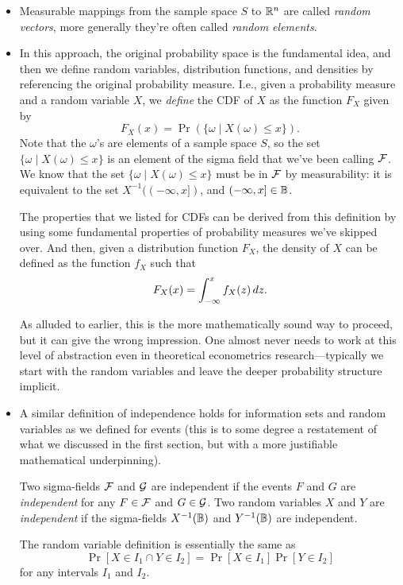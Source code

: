 \begin{itemize}[leftmargin=0pt]
\item Measurable mappings from the sample space $S$ to $\mathbb{R}^n$ are
  called \emph{random vectors}, more generally they're often called
  \emph{random elements}.

\item In this approach, the original probability space is the
  fundamental idea, and then we define random variables, distribution
  functions, and densities by referencing the original probability
  measure.  I.e., given a probability measure and a random variable
  $X$, we \emph{define} the CDF of $X$ as the function $F_X$ given by
  \begin{equation*}
    F_X(x) = \Pr(\{\omega \mid X(\omega) \leq x\}).
  \end{equation*}
  Note that the $\omega$'s are elements of a sample space $S$, so the
  set $\{\omega \mid X(\omega) \leq x\}$ is an element of the sigma
  field that we've been calling $\mathcal{F}$.  We know that the set $\{\omega
  \mid X(\omega) \leq x\}$ must be in $\mathcal{F}$ by measurability: it is
  equivalent to the set $X^{-1}((-\infty,x])$, and $(-\infty,x] \in
  \mathbb{B}$.

  The properties that we listed for CDFs can be derived from this
  definition by using some fundamental properties of probability
  measures we've skipped over.  And then, given a distribution
  function $F_X$, the density of $X$ can be defined as the function
  $f_X$ such that
  \begin{equation*}
    F_X(x) = \int_{-\infty}^{x} f_X(z) \,dz.
  \end{equation*}

  As alluded to earlier, this is the more mathematically sound way to
  proceed, but it can give the wrong impression.  One almost never
  needs to work at this level of abstraction even in theoretical
  econometrics research---typically we start with the random variables
  and leave the deeper probability structure implicit.

\item A similar definition of independence holds for information sets
  and random variables as we defined for events (this is to some
  degree a restatement of what we discussed in the first section, but
  with a more justifiable mathematical underpinning).
  \begin{defn}
    Two sigma-fields $\mathcal{F}$ and $\mathcal{G}$ are independent if the events $F$
    and $G$ are \emph{independent} for any $F \in \mathcal{F}$ and $G \in \mathcal{G}$.
    Two random variables $X$ and $Y$ are \emph{independent} if the
    sigma-fields $X^{-1}(\mathbb{B})$ and $Y^{-1}(\mathbb{B})$ are independent.
  \end{defn}
  The random variable definition is essentially the same as
  \begin{equation*}
    \Pr[X \in I_1 \cap Y \in I_2] = \Pr[X \in I_1] \Pr[Y \in I_2]
  \end{equation*}
  for any intervals $I_1$ and $I_2$.


\end{itemize}
